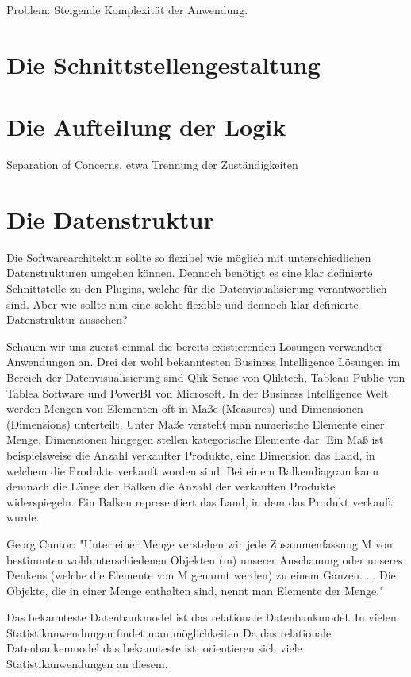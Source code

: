 Problem: Steigende Komplexität der Anwendung.

\section{Die Schnittstellengestaltung}

\section{Die Aufteilung der Logik}
\label{sec:die-aufteilung-der-logic}
Separation of Concerns, etwa Trennung der Zuständigkeiten

\section{Die Datenstruktur}
Die Softwarearchitektur sollte so flexibel wie möglich mit unterschiedlichen Datenstrukturen
umgehen können. Dennoch benötigt es eine klar definierte Schnittstelle zu den Plugins,
welche für die Datenvisualisierung verantwortlich sind. Aber wie sollte nun eine solche flexible 
und dennoch klar definierte Datenstruktur aussehen?

Schauen wir uns zuerst einmal die bereits existierenden Lösungen verwandter Anwendungen an. Drei der
wohl bekanntesten Business Intelligence Lösungen im Bereich der Datenvisualisierung sind Qlik Sense
von Qliktech, Tableau Public von Tablea Software und PowerBI von Microsoft. In der Business Intelligence
Welt werden Mengen von Elementen oft in Maße (Measures) und Dimensionen (Dimensions) unterteilt. Unter Maße versteht
man numerische Elemente einer Menge, Dimensionen hingegen stellen kategorische Elemente dar. Ein Maß
ist beispielsweise die Anzahl verkaufter Produkte, eine Dimension das Land, in welchem die Produkte verkauft worden
sind. Bei einem Balkendiagram kann demnach die Länge der Balken die Anzahl der verkauften Produkte
widerspiegeln. Ein Balken representiert das Land, in dem das Produkt verkauft wurde.


Georg Cantor: "Unter einer Menge verstehen wir jede Zusammenfassung M von bestimmten wohlunterschiedenen
Objekten (m) unserer Anschauung oder unseres Denkens (welche die Elemente von M genannt werden) zu einem Ganzen.
... Die Objekte, die in einer Menge enthalten sind, nennt man Elemente der Menge."

Das bekannteste Datenbankmodel ist das relationale Datenbankmodel. In vielen Statistikanwendungen findet
man möglichkeiten
Da das relationale Datenbankenmodel das bekannteste ist, orientieren sich viele Statistikanwendungen an diesem.

